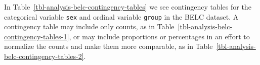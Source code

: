 \documentclass[
  letterpaper,
  krantz1]{latex/krantz-mod}
\theoremstyle{definition}
\theoremstyle{definition}
\theoremstyle{remark}
\begin{document}
In Table~\ref{tbl-analysis-belc-contingency-tables} we see contingency
tables for the categorical variable \texttt{sex} and ordinal variable
\texttt{group} in the BELC dataset. A contingency table may include only
counts, as in Table~\ref{tbl-analysis-belc-contingency-tables-1}, or may
include proportions or percentages in an effort to normalize the counts
and make them more comparable, as in
Table~\ref{tbl-analysis-belc-contingency-tables-2}.

\begin{table}

\caption{\label{tbl-analysis-belc-contingency-tables}Contingency tables
for categorical variable \texttt{sex} and ordinal variable
\texttt{group}}

\begin{minipage}{0.50\linewidth}



\end{minipage}%
%
\begin{minipage}{0.50\linewidth}



\end{minipage}%

\end{table}%
\end{document}
